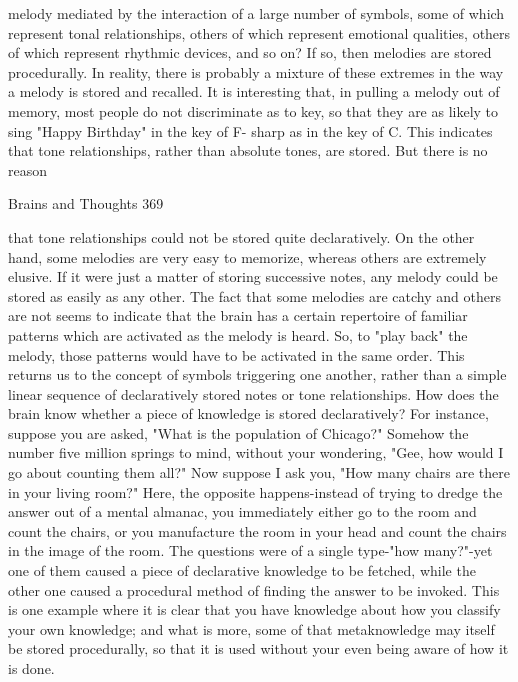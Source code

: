 melody mediated by the interaction of a large number of symbols, some of which
represent tonal relationships, others of which represent emotional qualities, others of
which represent rhythmic devices, and so on? If so, then melodies are stored
procedurally. In reality, there is probably a mixture of these extremes in the way a
melody is stored and recalled.
        It is interesting that, in pulling a melody out of memory, most people do not
discriminate as to key, so that they are as likely to sing "Happy Birthday" in the key of F-
sharp as in the key of C. This indicates that tone relationships, rather than absolute tones,
are stored. But there is no reason




Brains and Thoughts                                                                      369

that tone relationships could not be stored quite declaratively. On the other hand, some
melodies are very easy to memorize, whereas others are extremely elusive. If it were just
a matter of storing successive notes, any melody could be stored as easily as any other.
The fact that some melodies are catchy and others are not seems to indicate that the brain
has a certain repertoire of familiar patterns which are activated as the melody is heard.
So, to "play back" the melody, those patterns would have to be activated in the same
order. This returns us to the concept of symbols triggering one another, rather than a
simple linear sequence of declaratively stored notes or tone relationships.
        How does the brain know whether a piece of knowledge is stored declaratively?
For instance, suppose you are asked, "What is the population of Chicago?" Somehow the
number five million springs to mind, without your wondering, "Gee, how would I go
about counting them all?" Now suppose I ask you, "How many chairs are there in your
living room?" Here, the opposite happens-instead of trying to dredge the answer out of a
mental almanac, you immediately either go to the room and count the chairs, or you
manufacture the room in your head and count the chairs in the image of the room. The
questions were of a single type-"how many?"-yet one of them caused a piece of
declarative knowledge to be fetched, while the other one caused a procedural method of
finding the answer to be invoked. This is one example where it is clear that you have
knowledge about how you classify your own knowledge; and what is more, some of that
metaknowledge may itself be stored procedurally, so that it is used without your even
being aware of how it is done.

